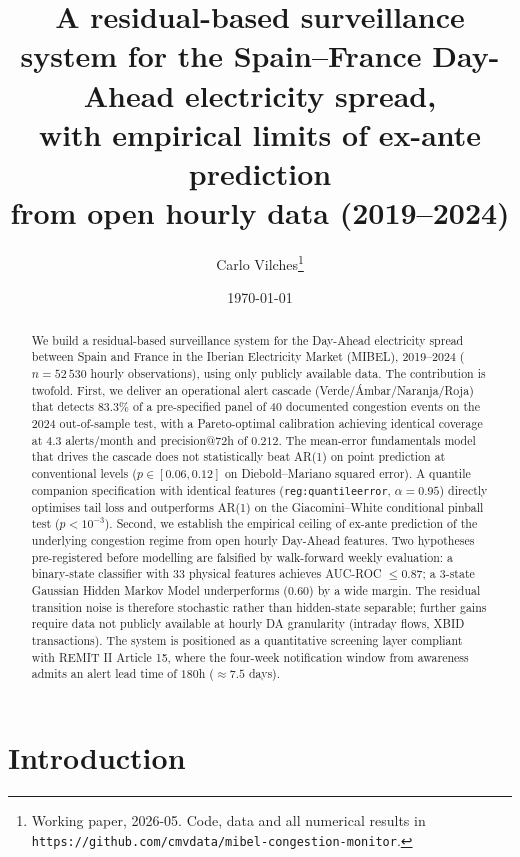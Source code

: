 \documentclass[11pt,a4paper]{article}
\title{\textbf{A residual-based surveillance system for the
Spain--France Day-Ahead electricity spread,\\
with empirical limits of ex-ante prediction\\
from open hourly data (2019--2024)}}
\author{Carlo Vilches\thanks{Working paper, 2026-05. Code, data and
all numerical results in
\texttt{https://github.com/cmvdata/mibel-congestion-monitor}.}}
\date{\today}
\begin{document}
\maketitle

\begin{abstract}
\noindent
We build a residual-based surveillance system for the Day-Ahead
electricity spread between Spain and France in the Iberian
Electricity Market (MIBEL), 2019--2024 ($n = 52\,530$ hourly
observations), using only publicly available data. The contribution
is twofold. First, we deliver an operational alert cascade
(Verde/Ámbar/Naranja/Roja) that detects $83.3\%$ of a pre-specified
panel of 40 documented congestion events on the 2024 out-of-sample
test, with a Pareto-optimal calibration achieving identical coverage
at $4.3$ alerts/month and precision@72h of $0.212$. The mean-error
fundamentals model that drives the cascade does not statistically
beat AR(1) on point prediction at conventional levels
($p \in [0.06, 0.12]$ on Diebold--Mariano squared error). A quantile
companion specification with identical features
(\texttt{reg:quantileerror}, $\alpha = 0.95$) directly optimises tail
loss and outperforms AR(1) on the Giacomini--White conditional pinball
test ($p < 10^{-3}$). Second, we establish the empirical ceiling of
ex-ante prediction of the underlying congestion regime from open
hourly Day-Ahead features. Two hypotheses pre-registered before
modelling are falsified by walk-forward weekly evaluation: a
binary-state classifier with 33 physical features achieves
AUC-ROC $\leq 0.87$; a 3-state Gaussian Hidden Markov Model
underperforms ($0.60$) by a wide margin. The residual transition
noise is therefore stochastic rather than hidden-state separable;
further gains require data not publicly available at hourly DA
granularity (intraday flows, XBID transactions). The system is
positioned as a quantitative screening layer compliant with REMIT II
Article 15, where the four-week notification window from awareness
admits an alert lead time of $180$h ($\approx 7.5$ days).
\end{abstract}

\section{Introduction}\label{sec:intro}
\end{document}
